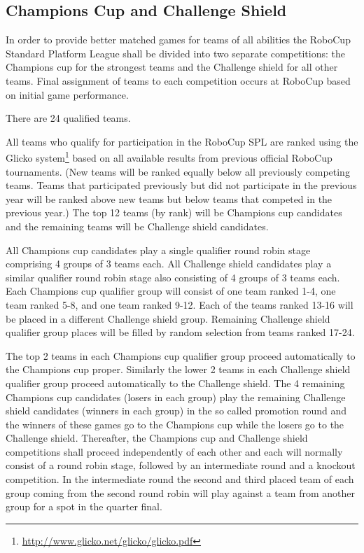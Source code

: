 \documentclass[12pt]{article}
\begin{document}
\subsection{Champions Cup and Challenge Shield}
\label{sec:twoCompetitions}
In order to provide better matched games for teams of all abilities the RoboCup Standard Platform League shall be divided into two separate competitions: the Champions cup for the strongest teams and the Challenge shield for all other teams. Final assignment of teams to each competition occurs at RoboCup based on initial game performance.

There are 24 qualified teams.

All teams who qualify for participation in the RoboCup SPL are ranked using the Glicko system\footnote{\url{http://www.glicko.net/glicko/glicko.pdf}} based on all available results from previous official RoboCup tournaments. (New teams will be ranked equally below all previously competing teams. Teams that participated previously but did not participate in the previous year will be ranked above new teams but below teams that competed in the previous year.) The top 12 teams (by rank) will be Champions cup candidates and the remaining teams will be Challenge shield candidates.

All Champions cup candidates play a single qualifier round robin stage comprising 4 groups of 3 teams each. All Challenge shield candidates play a similar qualifier round robin stage also consisting of 4 groups of 3 teams each. Each Champions cup qualifier group will consist of one team ranked 1-4, one team ranked 5-8, and one team ranked 9-12. Each of the teams ranked 13-16 will be placed in a different Challenge shield group. Remaining Challenge shield qualifier group places will be filled by random selection from teams ranked 17-24.

The top 2 teams in each Champions cup qualifier group proceed automatically to the Champions cup proper. Similarly the lower 2 teams in each Challenge shield qualifier group proceed automatically to the Challenge shield. The 4 remaining Champions cup candidates (losers in each group) play the remaining Challenge shield candidates (winners in each group) in the so called promotion round and the winners of these games go to the Champions cup while the losers go to the Challenge shield. Thereafter, the Champions cup and Challenge shield competitions shall proceed independently of each other and each will normally consist of a round robin stage, followed by an intermediate round and a knockout competition. In the intermediate round the second and third placed team of each group coming from the second round robin will play against a team from another group for a spot in the quarter final.
\end{document}
